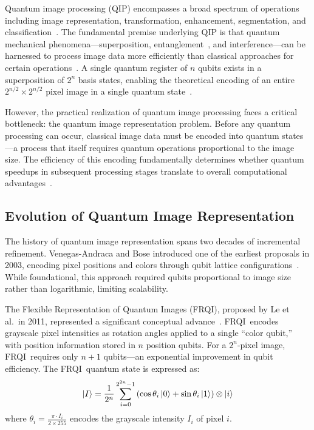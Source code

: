 \documentclass{ipol}
\newcommand{\frqi}{\textsc{FRQI}}
\begin{document}
Quantum image processing (QIP) encompasses a broad spectrum of operations
including image representation, transformation, enhancement, segmentation, and
classification~\cite{ref13,ref52}. The fundamental premise underlying QIP is that
quantum mechanical phenomena---superposition, entanglement~\cite{ref60}, and
interference---can be harnessed to process image data more efficiently than
classical approaches for certain operations~\cite{ref57}. A single quantum register of $n$
qubits exists in a superposition of $2^n$ basis states, enabling the
theoretical encoding of an entire $2^{n/2} \times 2^{n/2}$ pixel image in a
single quantum state~\cite{ref14}.

However, the practical realization of quantum image processing faces a
critical bottleneck: the quantum image representation problem. Before any
quantum processing can occur, classical image data must be encoded into
quantum states---a process that itself requires quantum operations
proportional to the image size. The efficiency of this encoding fundamentally
determines whether quantum speedups in subsequent processing stages translate
to overall computational advantages~\cite{ref15}.

\FloatBarrier
\subsection{Evolution of Quantum Image Representation}

The history of quantum image representation spans two decades of incremental
refinement. Venegas-Andraca and Bose introduced one of the earliest proposals
in 2003, encoding pixel positions and colors through qubit lattice
configurations~\cite{ref16}. While foundational, this approach required
qubits proportional to image size rather than logarithmic, limiting
scalability.

The Flexible Representation of Quantum Images (\frqi), proposed by Le et al.\
in 2011, represented a significant conceptual advance~\cite{ref3}. \frqi\
encodes grayscale pixel intensities as rotation angles applied to a single
``color qubit,'' with position information stored in $n$ position qubits.
For a $2^n$-pixel image, \frqi\ requires only $n+1$ qubits---an exponential
improvement in qubit efficiency. The \frqi\ quantum state is expressed as:
$$\ket{I} = \frac{1}{2^n} \sum_{i=0}^{2^{2n}-1} \left(\cos\theta_i\ket{0}
  + \sin\theta_i\ket{1}\right) \otimes \ket{i}$$
where $\theta_i = \frac{\pi \cdot I_i}{2 \times 255}$ encodes the grayscale
intensity $I_i$ of pixel $i$.
\end{document}
